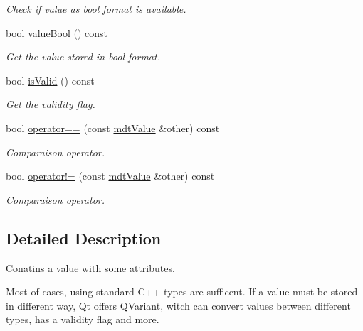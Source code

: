 \begin{DoxyCompactItemize}
\begin{DoxyCompactList}\small\item\em Check if value as bool format is available. \end{DoxyCompactList}\item 
\hypertarget{classmdt_value_acd0d628fdee31ce640f1bc76f3833173}{
bool \hyperlink{classmdt_value_acd0d628fdee31ce640f1bc76f3833173}{valueBool} () const }
\label{classmdt_value_acd0d628fdee31ce640f1bc76f3833173}

\begin{DoxyCompactList}\small\item\em Get the value stored in bool format. \end{DoxyCompactList}\item 
bool \hyperlink{classmdt_value_a472996d8c32ce70e9332509151d6aed1}{isValid} () const 
\begin{DoxyCompactList}\small\item\em Get the validity flag. \end{DoxyCompactList}\item 
bool \hyperlink{classmdt_value_acbb1e7472e9b6e105ba5ffe03476f4d4}{operator==} (const \hyperlink{classmdt_value}{mdtValue} \&other) const 
\begin{DoxyCompactList}\small\item\em Comparaison operator. \end{DoxyCompactList}\item 
\hypertarget{classmdt_value_a9d01fff18ab97a5f25d5f82655d42810}{
bool \hyperlink{classmdt_value_a9d01fff18ab97a5f25d5f82655d42810}{operator!=} (const \hyperlink{classmdt_value}{mdtValue} \&other) const }
\label{classmdt_value_a9d01fff18ab97a5f25d5f82655d42810}

\begin{DoxyCompactList}\small\item\em Comparaison operator. \end{DoxyCompactList}\end{DoxyCompactItemize}


\subsection{Detailed Description}
Conatins a value with some attributes. 

Most of cases, using standard C++ types are sufficent. If a value must be stored in different way, Qt offers QVariant, witch can convert values between different types, has a validity flag and more.

